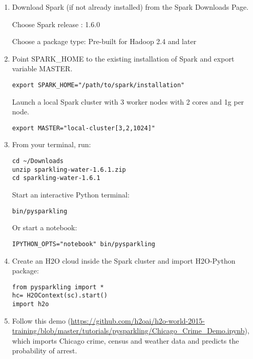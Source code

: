 \begin{enumerate}
\item Download Spark (if not already installed) from the Spark Downloads Page.

Choose Spark release : 1.6.0

Choose a package type: Pre-built for Hadoop 2.4 and later

\item Point SPARK\_HOME to the existing installation of Spark and export variable MASTER.

\begin{lstlisting}[style=Bash]
export SPARK_HOME="/path/to/spark/installation" 
\end{lstlisting}

Launch a local Spark cluster with 3 worker nodes with 2 cores and 1g per node.
\begin{lstlisting}[style=Bash]
export MASTER="local-cluster[3,2,1024]" 
\end{lstlisting}

\item From your terminal, run:

\begin{lstlisting}[style=Bash]
cd ~/Downloads
unzip sparkling-water-1.6.1.zip
cd sparkling-water-1.6.1
\end{lstlisting}

Start an interactive Python terminal:
\begin{lstlisting}[style=Bash]
bin/pysparkling
\end{lstlisting}

Or start a notebook:
\begin{lstlisting}[style=Bash]
IPYTHON_OPTS="notebook" bin/pysparkling
\end{lstlisting}

\item Create an H2O cloud inside the Spark cluster and import H2O-Python package:

\begin{lstlisting}[style=Scala]
from pysparkling import *
hc= H2OContext(sc).start()
import h2o
\end{lstlisting}

\item Follow this demo (\url{https://github.com/h2oai/h2o-world-2015-training/blob/master/tutorials/pysparkling/Chicago_Crime_Demo.ipynb}), which imports Chicago crime, census and weather data and predicts the probability of arrest.

\end{enumerate}

